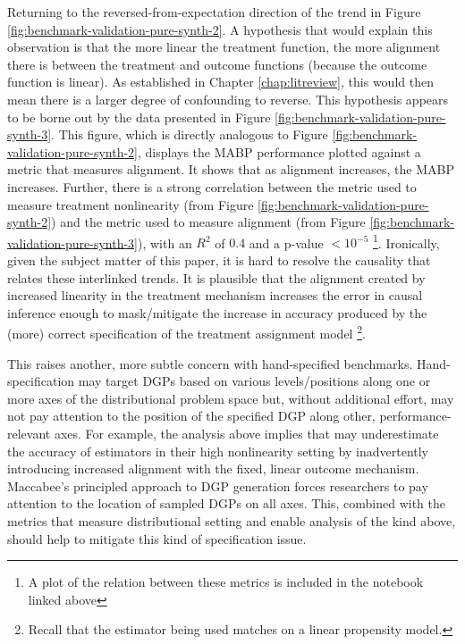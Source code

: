 \documentclass[../main.tex]{subfiles}
\begin{document}
Returning to the reversed-from-expectation direction of the trend in Figure \ref{fig:benchmark-validation-pure-synth-2}. A hypothesis that would explain this observation is that the more linear the treatment function, the more alignment there is between the treatment and outcome functions (because the outcome function is linear). As established in Chapter \ref{chap:litreview}, this would then mean there is a larger degree of confounding to reverse. This hypothesis appears to be borne out by the data presented in Figure \ref{fig:benchmark-validation-pure-synth-3}. This figure, which is directly analogous to Figure \ref{fig:benchmark-validation-pure-synth-2}, displays the MABP performance plotted against a metric that measures alignment. It shows that as alignment increases, the MABP increases. Further, there is a strong correlation between the metric used to measure treatment nonlinearity (from Figure \ref{fig:benchmark-validation-pure-synth-2}) and the metric used to measure alignment (from Figure \ref{fig:benchmark-validation-pure-synth-3}), with an $R^2$ of $0.4$ and a p-value $< 10^{-5}$ \footnote{A plot of the relation between these metrics is included in the notebook linked above}. Ironically, given the subject matter of this paper, it is hard to resolve the causality that relates these interlinked trends. It is plausible that the alignment created by increased linearity in the treatment mechanism increases the error in causal inference enough to mask/mitigate the increase in accuracy produced by the (more) correct specification of the treatment assignment model \footnote{Recall that the estimator being used matches on a linear propensity model.}.

\vspace{\baselineskip}

This raises another, more subtle concern with hand-specified benchmarks. Hand-specification may target DGPs based on various levels/positions along one or more axes of the distributional problem space but, without additional effort, may not pay attention to the position of the specified DGP along other, performance-relevant axes. For example, the analysis above implies that \textcite{Diamond2013GeneticStudies} may underestimate the accuracy of estimators in their high nonlinearity setting by inadvertently introducing increased alignment with the fixed, linear outcome mechanism. Maccabee's principled approach to DGP generation forces researchers to pay attention to the location of sampled DGPs on all axes. This, combined with the metrics that measure distributional setting and enable analysis of the kind above, should help to mitigate this kind of specification issue.
\end{document}
